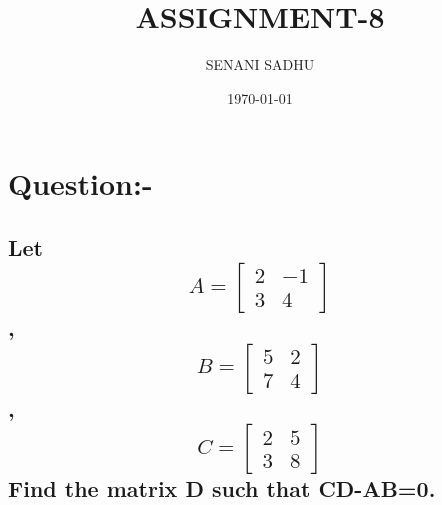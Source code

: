 \documentclass[a4paper,12pt]{article}
\title{ASSIGNMENT-8}
\author{SENANI SADHU}
\date{\today}
\begin{document}
	\maketitle
	\newpage
	\section{Question:-}
	\subsection{Let \[A=\begin{bmatrix}
		2 & -1\\
		3 & 4
	\end{bmatrix}\],\[B=\begin{bmatrix}
	5 & 2\\
	7 & 4
\end{bmatrix}\],
\[C=\begin{bmatrix}
	2 & 5\\
	3 & 8
\end{bmatrix}\]
Find the matrix D such that CD-AB=0.}
\end{document}
